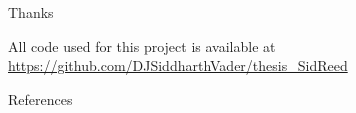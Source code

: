 \documentclass[dvipsnames]{beamer}
\newcommand{\myurl}[2][blue]{{\color{#1}\url{#2}}}
\begin{document}
\begin{frame}{Thanks}
\begin{multicols}{2}
\begin{minipage}[b][20ex][t]{\linewidth}
\begin{figure}[htb!]
    \end{figure}
    \end{minipage}
    \begin{minipage}[b][20ex][t]{\linewidth}
        \vspace{0.1in}
        All code used for this project is available at
        \myurl[blue]{https://github.com/DJSiddharthVader/thesis_SidReed}
    \end{minipage}
    \end{multicols}
\end{frame}
\begin{frame}{References}
    \printbibliography
    \addtocounter{framenumber}{-5}
\end{frame}
\end{document}

